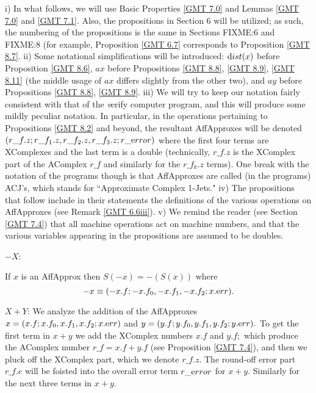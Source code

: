 \begin{conventions}\label{GMT 8.3}
i)  In what follows, we will use Basic Properties \ref{GMT 7.0} and Lemmas \ref{GMT 7.0} and \ref{GMT 7.1}.  Also, the propositions in Section 6
will be utilized;  as such, the numbering of the propositions is the same in Sections FIXME:6 and FIXME:8 (for example,
	Proposition \ref{GMT 6.7} corresponds to Proposition \ref{GMT 8.7}.  
	ii)  Some notational simplifications will be introduced: ${\textrm dist}(x)$ before Proposition \ref{GMT 8.6}, $ax$ before Propositions \ref{GMT 8.8}, \ref{GMT 8.9}, \ref{GMT 8.11}
	(the middle usage of $ax$ differs slightly from the other two), and $ay$ before Propositions \ref{GMT 8.8}, \ref{GMT 8.9}.
	iii)  We will try to keep our notation fairly consistent with that of the {\textit verify} computer program, and this will produce some mildly peculiar notation.  In particular, in the operations pertaining to Propositions \ref{GMT 8.2} and beyond, the resultant AffApproxes will be denoted $(r\_f.z; r\_f_1.z, r\_f_2.z, 
r\_f_3.z; r\_{\textrm error})$
where the first four terms are XComplexes and the last term is a double (technically, $r\_f.z$ is the XComplex part of the AComplex  $r\_f$ and similarly for the $r\_f_k.z$ terms).  One break with the notation of the programs though is that AffApproxes are called (in the programs) ACJ's, which stands for ``Approximate Complex 1-Jets."
iv) The propositions that follow include in their statements the definitions of the various operations on AffApproxes (see Remark
	\ref{GMT 6.6iii}).
	v)  We remind the reader (see Section \ref{GMT 7.4}) that all machine operations act on machine numbers, and that the 
various variables appearing in the propositions are assumed to be doubles.
\end{conventions}

$-X$:

\begin{proposition}\label{GMT 8.1}
If $x$ is an AffApprox 
then $S(-x) = -(S(x))$ where
$$-x \equiv (-x.f; -x.f_0,-x.f_1,-x.f_2; x.{\textrm err}).$$ \end{proposition}


$X+Y$:
We analyze the addition of the  {\textrm AffApproxes} 
 $x = (x.f; x.f_0,x.f_1, x.f_2; x.{\textrm err})$  and 
$y = (y.f; y.f_0,y.f_1,y.f_2; y.{\textrm err}).$  To get the first term in $x+y$ we add the XComplex numbers $x.f$ and $y.f;$ which
produce the AComplex number $r\_f = x.f + y.f$ (see Proposition \ref{GMT 7.4}), and then we pluck off the XComplex part,
which we denote $r\_f.z.$  The round-off error part $r\_f.e$ will be foisted into the overall error term $r\_{\textrm error}$
for $x+y.$ Similarly for the next three terms in $x + y.$

